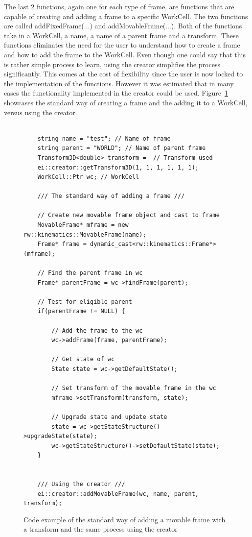 The last 2 functions, again one for each type of frame, are functions that are capable of creating and adding a frame to a specific WorkCell. The two functions are called addFixedFrame(...) and addMovableFrame(...). Both of the functions take in a WorkCell, a name, a name of a parent frame and a transform. These functions eliminates the need for the user to understand how to create a frame and how to add the frame to the WorkCell. Even though one could say that this is rather simple process to learn, using the creator simplifies the process significantly. This comes at the cost of flexibility since the user is now locked to the implementation of the functions. However it was estimated that in many cases the functionality implemented in the creator could be used. Figure~\ref{fig:CodeExampleAddFrameDifference} showcases the standard way of creating a frame and the adding it to a WorkCell, versus using the creator.

\begin{figure}[h]
	\centering
	\lstset{language=C++} 
	\begin{lstlisting}[frame=single]

	string name = "test"; // Name of frame
	string parent = "WORLD"; // Name of parent frame
	Transform3D<double> transform =  // Transform used
	ei::creator::getTransform3D(1, 1, 1, 1, 1, 1);
	WorkCell::Ptr wc; // WorkCell

	/// The standard way of adding a frame ///
	
	// Create new movable frame object and cast to frame
	MovableFrame* mframe = new rw::kinematics::MovableFrame(name);
    Frame* frame = dynamic_cast<rw::kinematics::Frame*>(mframe);
    
    // Find the parent frame in wc
    Frame* parentFrame = wc->findFrame(parent);
	
	// Test for eligible parent
	if(parentFrame != NULL) {
	
		// Add the frame to the wc
        wc->addFrame(frame, parentFrame);
		
		// Get state of wc
		State state = wc->getDefaultState();
		
		// Set transform of the movable frame in the wc
		mframe->setTransform(transform, state);
		
		// Upgrade state and update state
		state = wc->getStateStructure()->upgradeState(state); 
		wc->getStateStructure()->setDefaultState(state); 
    }
	
	
	/// Using the creator ///
	ei::creator::addMovableFrame(wc, name, parent, transform);

	\end{lstlisting}
	\caption{Code example of the standard way of adding a movable frame with a transform and the same process using the creator}
	\label{fig:CodeExampleAddFrameDifference}
\end{figure}

